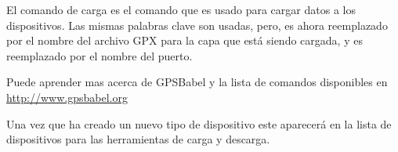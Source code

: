 El comando de carga es el comando que es usado para cargar datos a los dispositivos.
Las mismas palabras clave son usadas, pero,  es ahora reemplazado por el nombre  del archivo GPX  para la capa que está siendo cargada, y  es reemplazado por el nombre del puerto.

Puede aprender mas acerca de GPSBabel y la lista de comandos disponibles en \url{http://www.gpsbabel.org}

Una vez que ha creado un nuevo tipo de dispositivo este aparecerá en la lista de dispositivos para las herramientas de carga y descarga.
